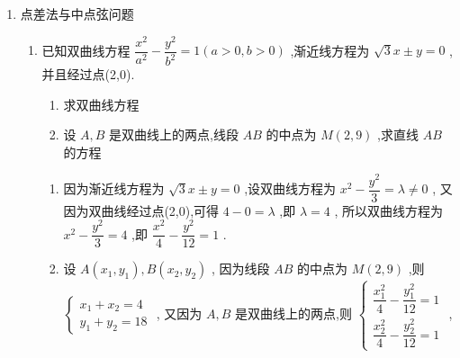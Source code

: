 \begin{enumerate}
\begin{enumerate}
\begin{jieda}
            在双曲线 $C$ 中,易知 $\left| {FA}\right|  = b$，又 $3\left| {FA}\right|  = \left| {AB}\right|$，则 $\left| {DB}\right|  = {2b}$，则 $D$ 为线段 ${FB}$ 的中点，所以 $\bigtriangleup {F}_{1}{BF}$ 为等腰三角形
            
            又 $\left| {FB}\right|  = {4b},\left| {{F}_{1}B}\right|  = {4b} - {2a} = \left| {{F}_{1}F}\right|  = {2c}$，即 $c + a = {2b}$，又 ${b}^{2} = {c}^{2} - {a}^{2} = \left( {c + a}\right) \left( {c - a}\right)$ ,
            
            将 $b = \dfrac{c + a}{2}$ 代入得 $\dfrac{{\left( c + a\right) }^{2}}{4} = \left( {c + a}\right) \left( {c - a}\right)$，得 $c + a = 4\left( {c - a}\right)$，则 $c = \dfrac{5}{3}a$，又 ${c}^{2} = {a}^{2} + {b}^{2}$，所以 $b = \dfrac{4}{3}a$ ,则渐近线方程为 $y =  \pm  \dfrac{4}{3}x$ .
        \end{jieda}
    \end{enumerate}
    \item 点差法与中点弦问题
    \begin{enumerate}
        \item 已知双曲线方程 $\dfrac{{x}^{2}}{{a}^{2}} - \dfrac{{y}^{2}}{{b}^{2}} = 1\left( {a > 0,b > 0}\right)$ ,渐近线方程为 $\sqrt{3}x \pm  y = 0$ ,并且经过点(2,0).
        \begin{enumerate}
            \item 求双曲线方程
            \item 设 $A,B$ 是双曲线上的两点,线段 ${AB}$ 的中点为 $M\left( {2,9}\right)$ ,求直线 ${AB}$ 的方程
        \end{enumerate}
        \begin{jieda}
            \begin{enumerate}
                \item 因为渐近线方程为 $\sqrt{3}x \pm  y = 0$ ,设双曲线方程为 ${x}^{2} - \dfrac{{y}^{2}}{3} = \lambda  \neq  0$ ,
                又因为双曲线经过点(2,0),可得 $4 - 0 = \lambda$ ,即 $\lambda  = 4$ ,
                所以双曲线方程为 ${x}^{2} - \dfrac{{y}^{2}}{3} = 4$ ,即 $\dfrac{{x}^{2}}{4} - \dfrac{{y}^{2}}{12} = 1$ .
                \item 设 $A\left( {{x}_{1},{y}_{1}}\right) ,B\left( {{x}_{2},{y}_{2}}\right)$ ,
                因为线段 ${AB}$ 的中点为 $M\left( {2,9}\right)$ ,则 $\left\{  \begin{array}{l} {x}_{1} + {x}_{2} = 4 \\  {y}_{1} + {y}_{2} = {18} \end{array}\right.$ ,
                又因为 $A,B$ 是双曲线上的两点,则 $\left\{  \begin{array}{l} \dfrac{{x}_{1}^{2}}{4} - \dfrac{{y}_{1}^{2}}{12} = 1 \\  \dfrac{{x}_{2}^{2}}{4} - \dfrac{{y}_{2}^{2}}{12} = 1 \end{array}\right.$ ,

\end{enumerate}
\end{jieda}
\end{enumerate}
\end{enumerate}
